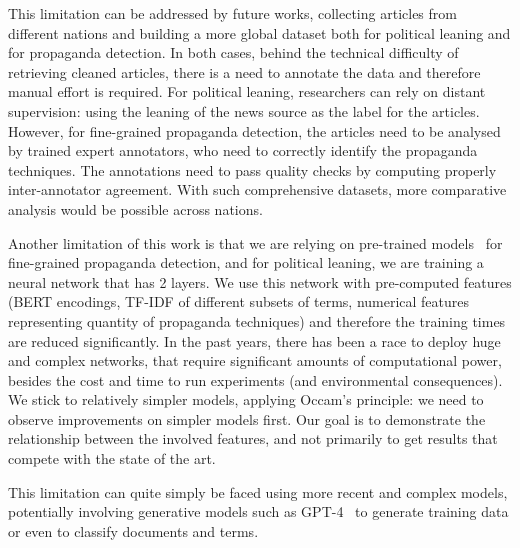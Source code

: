 This limitation can be addressed by future works, collecting articles from different nations and building a more global dataset both for political leaning and for propaganda detection. In both cases, behind the technical difficulty of retrieving cleaned articles, there is a need to annotate the data and therefore manual effort is required. For political leaning, researchers can rely on distant supervision: using the leaning of the news source as the label for the articles. However, for fine-grained propaganda detection, the articles need to be analysed by trained expert annotators, who need to correctly identify the propaganda techniques. The annotations need to pass quality checks by computing properly inter-annotator agreement. With such comprehensive datasets, more comparative analysis would be possible across nations.

Another limitation of this work is that we are 
relying on pre-trained models~\citep{da2019fine} for fine-grained propaganda detection, and 
for political leaning, we are training a neural network that has 2 layers. We use this network with pre-computed features (BERT encodings, TF-IDF of different subsets of terms, numerical features representing quantity of propaganda techniques) and therefore the training times are reduced significantly.
In the past years, there has been a race to deploy huge and complex networks, that require significant amounts of computational power, besides the cost and time to run experiments (and environmental consequences).
We stick to relatively simpler models, applying Occam's principle: we need to observe improvements on simpler models first.
Our goal is to demonstrate the relationship between the involved features, and not primarily to get results that compete with the state of the art.

This limitation can quite simply be faced using more recent and complex models, potentially involving generative models such as GPT-4~\citep{openai2023gpt4} to generate training data or even to classify documents and terms.




